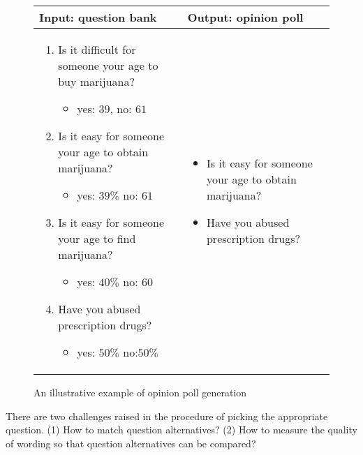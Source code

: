 \documentclass{llncs}
\begin{document}
\begin{figure}[htbp]
\begin{center}

\begin{tabular}{|p{5cm}|p{5cm}|}
\hline
Input: question bank & Output: opinion poll\\
\hline
\begin{enumerate}
\item Is it difficult for someone your age to buy marijuana?
\begin{itemize}
\item yes: $39$, no: $61$
\end{itemize}
\item Is it easy for someone your age to obtain marijuana?
\begin{itemize}
\item yes: $39\%$ no: $61$
\end{itemize}
\item Is it easy for someone your age to find marijuana?
\begin{itemize}
\item yes: $40\%$ no: $60$
\end{itemize}
\item Have you abused prescription drugs? 
\begin{itemize}
\item yes: $50\%$ no:$50\%$
\end{itemize}
\end{enumerate}
&
\begin{itemize}

\item Is it easy for someone your age to obtain marijuana?

\item Have you abused prescription drugs? 


\end{itemize}
\\
\hline
\end{tabular}



\caption{An illustrative example of opinion poll generation}
\label{fig:example}
\end{center}
\end{figure}



There are two challenges raised in the procedure of  picking the appropriate question.  (1) How to match question alternatives? (2) How to measure the quality of wording so that question alternatives can be compared? 
\end{document}

